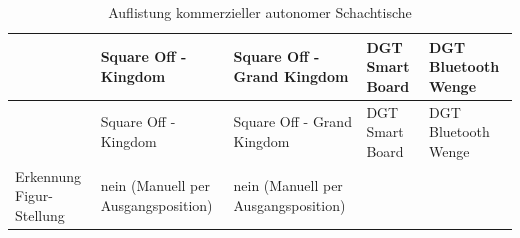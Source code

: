 \begin{longtable}[]{@{}lllll@{}}
\caption{Auflistung kommerzieller autonomer Schachtische}\tabularnewline
\toprule
\begin{minipage}[b]{0.19\columnwidth}\raggedright
\strut
\end{minipage} & \begin{minipage}[b]{0.19\columnwidth}\raggedright
Square Off - Kingdom \cite{squareoffkingdom}\strut
\end{minipage} & \begin{minipage}[b]{0.20\columnwidth}\raggedright
Square Off - Grand Kingdom \cite{squareoffgrand}\strut
\end{minipage} & \begin{minipage}[b]{0.15\columnwidth}\raggedright
DGT Smart Board \cite{dtgsmartboard}\strut
\end{minipage} & \begin{minipage}[b]{0.13\columnwidth}\raggedright
DGT Bluetooth Wenge \cite{dtgble}\strut
\end{minipage}\tabularnewline
\midrule
\endfirsthead
\toprule
\begin{minipage}[b]{0.19\columnwidth}\raggedright
\strut
\end{minipage} & \begin{minipage}[b]{0.19\columnwidth}\raggedright
Square Off - Kingdom \cite{squareoffkingdom}\strut
\end{minipage} & \begin{minipage}[b]{0.20\columnwidth}\raggedright
Square Off - Grand Kingdom \cite{squareoffgrand}\strut
\end{minipage} & \begin{minipage}[b]{0.15\columnwidth}\raggedright
DGT Smart Board \cite{dtgsmartboard}\strut
\end{minipage} & \begin{minipage}[b]{0.13\columnwidth}\raggedright
DGT Bluetooth Wenge \cite{dtgble}\strut
\end{minipage}\tabularnewline
\midrule
\endhead
\begin{minipage}[t]{0.19\columnwidth}\raggedright
Erkennung Figur-Stellung\strut
\end{minipage} & \begin{minipage}[t]{0.19\columnwidth}\raggedright
nein (Manuell per Ausgangsposition)\strut
\end{minipage} & \begin{minipage}[t]{0.20\columnwidth}\raggedright
nein (Manuell per Ausgangsposition)\strut
\end{minipage} & \begin{minipage}[t]{0.15\columnwidth}\raggedright

\end{minipage}
\end{longtable}
